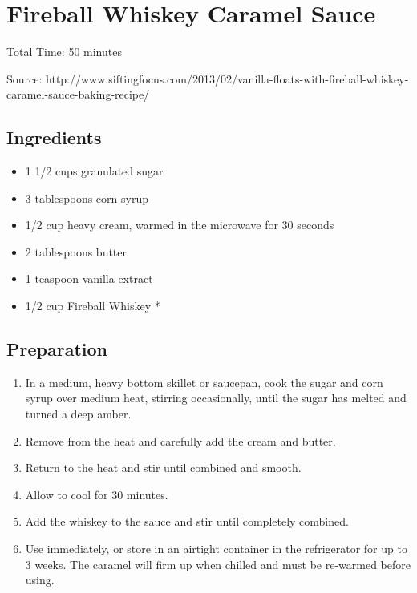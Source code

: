 \section{Fireball Whiskey Caramel Sauce}

\begin{center}
Total Time: 50 minutes

\vspace{1em}

Source: http://www.siftingfocus.com/2013/02/vanilla-floats-with-fireball-whiskey-caramel-sauce-baking-recipe/

\end{center}

\subsection{Ingredients}
\begin{multicols}{2}
\begin{itemize}
    \item 1 1/2 cups granulated sugar
    \item 3 tablespoons corn syrup
    \item 1/2 cup heavy cream, warmed in the microwave for 30 seconds
    \item 2 tablespoons butter
    \item 1 teaspoon vanilla extract
    \item 1/2 cup Fireball Whiskey *
\end{itemize}
\end{multicols}

\subsection{Preparation}
\begin{enumerate}
    \item In a medium, heavy bottom skillet or saucepan, cook the sugar and
          corn syrup over medium heat, stirring occasionally, until the sugar
          has melted and turned a deep amber.
    \item Remove from the heat and carefully add the cream and butter.
    \item Return to the heat and stir until combined and smooth.
    \item Allow to cool for 30 minutes.
    \item Add the whiskey to the sauce and stir until completely combined.
    \item Use immediately, or store in an airtight container in the refrigerator for up to 3 weeks.  The caramel will firm up when chilled and must be re-warmed before using.
\end{enumerate}

